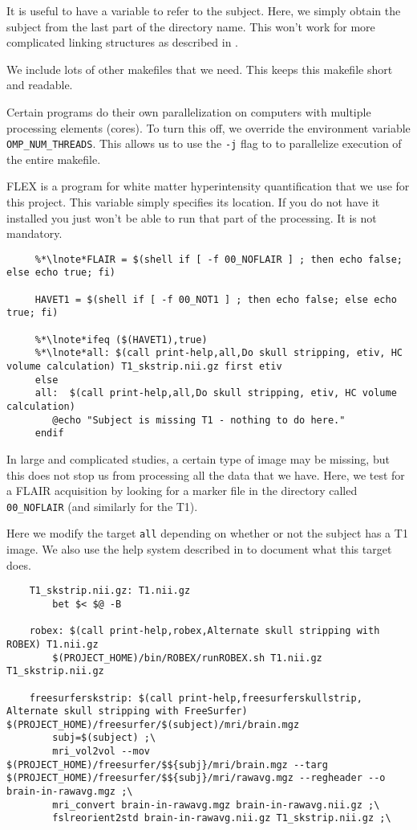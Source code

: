  It is useful to have a variable to refer to the
subject. Here, we simply obtain the subject from the last part of the
directory name. This won't work for more complicated linking
structures as described in . 

 We include lots of other makefiles that we need. This keeps
this makefile short and readable. 

 Certain programs do their own parallelization on computers
with multiple processing elements (cores). To turn this off, we
override the environment variable \texttt{OMP_NUM_THREADS}. This
allows us to use the \texttt{-j} flag to \maken{} to parallelize
execution of the entire makefile.

 FLEX is a program for white matter hyperintensity
quantification that we use for this project. This variable simply
specifies its location. If you do not have it installed you just won't
be able to run that part of the processing. It is not mandatory. 

\begin{lstlisting}
	 %*\lnote*FLAIR = $(shell if [ -f 00_NOFLAIR ] ; then echo false; else echo true; fi)

	 HAVET1 = $(shell if [ -f 00_NOT1 ] ; then echo false; else echo true; fi)

	 %*\lnote*ifeq ($(HAVET1),true)
	 %*\lnote*all: $(call print-help,all,Do skull stripping, etiv, HC volume calculation) T1_skstrip.nii.gz first etiv
	 else
	 all:  $(call print-help,all,Do skull stripping, etiv, HC volume calculation)
		@echo "Subject is missing T1 - nothing to do here."
	 endif
\end{lstlisting}

 In large and complicated studies, a certain type of image may
be missing, but this does not stop us from processing all the data
that we have. Here, we test for a FLAIR acquisition by looking for a
marker file in the directory called \texttt{00_NOFLAIR} (and similarly
for the T1). 

 Here we modify the target \texttt{all} depending on whether
or not the subject has a T1 image. We also use the help system
described in  to document what this target
does. 


\begin{lstlisting}
	T1_skstrip.nii.gz: T1.nii.gz 
		bet $< $@ -B

	robex: $(call print-help,robex,Alternate skull stripping with ROBEX) T1.nii.gz 
		$(PROJECT_HOME)/bin/ROBEX/runROBEX.sh T1.nii.gz T1_skstrip.nii.gz

	freesurferskstrip: $(call print-help,freesurferskullstrip, Alternate skull stripping with FreeSurfer) $(PROJECT_HOME)/freesurfer/$(subject)/mri/brain.mgz
		subj=$(subject) ;\
		mri_vol2vol --mov $(PROJECT_HOME)/freesurfer/$${subj}/mri/brain.mgz --targ $(PROJECT_HOME)/freesurfer/$${subj}/mri/rawavg.mgz --regheader --o brain-in-rawavg.mgz ;\
		mri_convert brain-in-rawavg.mgz brain-in-rawavg.nii.gz ;\
		fslreorient2std brain-in-rawavg.nii.gz T1_skstrip.nii.gz ;\
\end{lstlisting}

